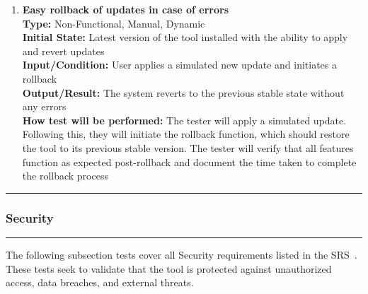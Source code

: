 \documentclass[12pt, titlepage]{article}
\newcommand{\colorrule}{\textcolor{BlueViolet}{\rule{\linewidth}{2pt}}}
\begin{document}
\begin{enumerate}[label={\bf \textcolor{Maroon}{test-MS-\arabic*}},
      wide=0pt, font=\itshape]
    \item \textbf{Easy rollback of updates in case of errors} \\[2mm]
      \textbf{Type:} Non-Functional, Manual, Dynamic \\
      \textbf{Initial State:} Latest version of the tool installed
      with the ability to apply and revert updates \\
      \textbf{Input/Condition:} User applies a simulated new update
      and initiates a rollback \\
      \textbf{Output/Result:} The system reverts to the previous
      stable state without any errors \\[2mm]
      \textbf{How test will be performed:} The tester will apply a
      simulated update. Following this, they will initiate the
      rollback function, which should restore the tool to its
      previous stable version. The tester will verify that all
      features function as expected post-rollback and document the
      time taken to complete the rollback process
  \end{enumerate}

  \newpage

  \noindent
  \colorrule

  \subsubsection{Security}
  \colorrule

  \medskip

  \noindent
  The following subsection tests cover all Security requirements
  listed in the SRS~\cite{SRS}. These tests seek to validate that the
  tool is protected against unauthorized access, data breaches, and
  external threats.
\end{document}
